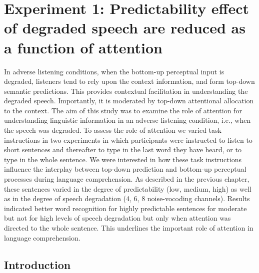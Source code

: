 \documentclass[a4paper, nobind]{templates/ociamthesis}
\begin{document}
\hypertarget{experiment-1-predictability-effect-of-degraded-speech-are-reduced-as-a-function-of-attention}{%
\chapter{Experiment 1: Predictability effect of degraded speech are reduced as a function of attention}\label{experiment-1-predictability-effect-of-degraded-speech-are-reduced-as-a-function-of-attention}}

\noindent
In adverse listening conditions, when the bottom-up perceptual input is degraded, listeners tend to rely upon the context information, and form top-down semantic predictions.
This provides contextual facilitation in understanding the degraded speech.
Importantly, it is moderated by top-down attentional allocation to the context.
The aim of this study was to examine the role of attention for understanding linguistic information in an adverse listening condition, i.e., when the speech was degraded.
To assess the role of attention we varied task instructions in two experiments in which participants were instructed to listen to short sentences and thereafter to type in the last word they have heard, or to type in the whole sentence.
We were interested in how these task instructions influence the interplay between top-down prediction and bottom-up perceptual processes during language comprehension.
As described in the previous chapter, these sentences varied in the degree of predictability (low, medium, high) as well as in the degree of speech degradation (4, 6, 8 noise-vocoding channels).
Results indicated better word recognition for highly predictable sentences for moderate but not for high levels of speech degradation but only when attention was directed to the whole sentence.
This underlines the important role of attention in language comprehension.

\hypertarget{introduction-1}{%
\section{Introduction}\label{introduction-1}}
\end{document}
